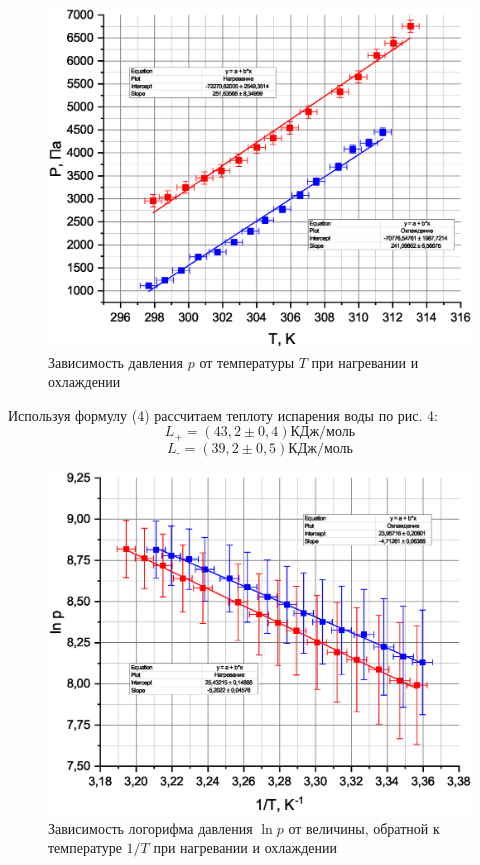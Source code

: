 \documentclass[a4paper,12pt]{article}
\theoremstyle{plain} %
\theoremstyle{definition} %
\theoremstyle{remark} %
\begin{document}
\begin{figure}[H]
	\begin{center}
	\includegraphics[width=\linewidth]{3}
	\captionsetup{justification=centering}
	\caption{Зависимость давления $p$ от температуры $T$ при нагревании и охлаждении}
\end{center}
\end{figure}
Используя формулу (4) рассчитаем теплоту испарения воды по рис. 4:
\[L_\text{+} = (43,2\pm 0,4)\text{КДж}/\text{моль}\]
\[L_\text{-} = (39,2\pm 0,5)\text{КДж}/\text{моль}\]
\begin{figure}[H]
	\begin{center}
		\includegraphics[width=\linewidth]{4}
		\captionsetup{justification=centering}
		\caption{Зависимость логорифма давления $\ln p$ от величины, обратной к температуре $1/T$ при нагревании и охлаждении}
	\end{center}
\end{figure}
\end{document}
